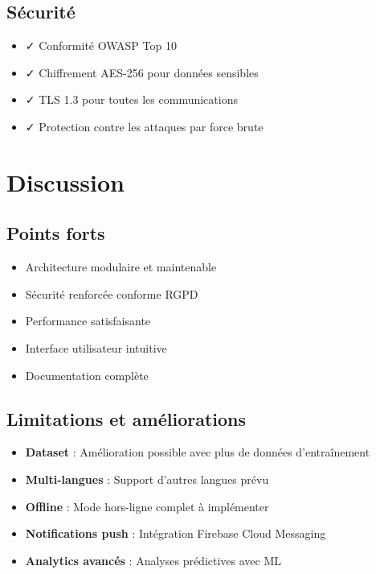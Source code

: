 \documentclass[a4paper,11pt]{report}
\begin{document}
\subsection{Sécurité}

\begin{itemize}
    \item ✓ Conformité OWASP Top 10
    \item ✓ Chiffrement AES-256 pour données sensibles
    \item ✓ TLS 1.3 pour toutes les communications
    \item ✓ Protection contre les attaques par force brute
\end{itemize}

\section{Discussion}

\subsection{Points forts}

\begin{itemize}
    \item Architecture modulaire et maintenable
    \item Sécurité renforcée conforme RGPD
    \item Performance satisfaisante
    \item Interface utilisateur intuitive
    \item Documentation complète
\end{itemize}

\subsection{Limitations et améliorations}

\begin{itemize}
    \item \textbf{Dataset} : Amélioration possible avec plus de données d'entraînement
    \item \textbf{Multi-langues} : Support d'autres langues prévu
    \item \textbf{Offline} : Mode hors-ligne complet à implémenter
    \item \textbf{Notifications push} : Intégration Firebase Cloud Messaging
    \item \textbf{Analytics avancés} : Analyses prédictives avec ML
\end{itemize}
\end{document}
